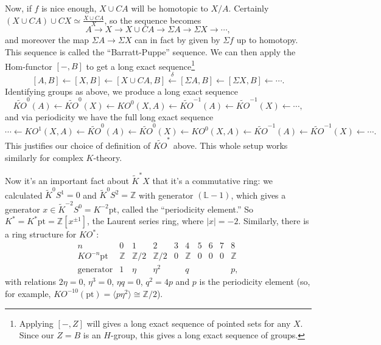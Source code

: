 \documentclass{article}
\newcommand{\Z}{\mathbb{Z}}
\newcommand{\bundle}[1]{\mathbb{#1}}
\newcommand{\ptspace}{\mathrm{pt}}
\newcommand{\Suspend}{\Sigma}
\newcommand{\from}{\leftarrow}
\begin{document}
Now, if $f$ is nice enough, $X \cup CA$ will be homotopic to $X / A$.  Certainly $(X \cup CA) \cup CX \simeq \frac{X \cup CA}{X}$, so the sequence becomes
\[
A \to X \to X \cup CA \to \Suspend A \to \Suspend X \to \cdots
,\]
and moreover the map $\Suspend A \to \Suspend X$ can in fact by given by $\Sigma f$ up to homotopy.  This sequence is called the ``Barratt-Puppe'' sequence.  We can then apply the Hom-functor $[-, B]$ to get a long exact sequence\footnote{Applying $[-, Z]$ will gives a long exact sequence of pointed sets for any $X$.  Since our $Z = B$ is an $H$-group, this gives a long exact sequence of groups.}
\[
[A, B] \from [X, B] \from [X \cup CA, B] \stackrel{\delta}{\from} [\Suspend A, B] \from [\Suspend X, B] \from \cdots
.\]
Identifying groups as above, we produce a long exact sequence
\[
\widetilde{KO}^0 (A) \from \widetilde{KO}^0(X) \from KO^0(X, A) \from \widetilde{KO}^{-1}(A) \from \widetilde{KO}^{-1}(X) \from \cdots
,\]
and via periodicity we have the full long exact sequence
\[
\cdots \from KO^1(X, A) \from \widetilde{KO}^0 (A) \from \widetilde{KO}^0(X) \from KO^0(X, A) \from \widetilde{KO}^{-1}(A) \from \widetilde{KO}^{-1}(X) \from \cdots
.\]
This justifies our choice of definition of $\widetilde{KO}^*$ above.  This whole setup works similarly for complex $K$-theory.

Now it's an important fact about $\tilde K^* X$ that it's a commutative ring: we calculated $\tilde K^0 S^1 = 0$ and $\tilde K^0 S^2 = \Z$ with generator $(\bundle{L} - 1)$, which gives a generator $x \in \tilde K^{-2} S^0 = K^{-2} \ptspace$, called the ``periodicity element.''  So $K^* = K^* \ptspace = \Z[x^{\pm 1}]$, the Laurent series ring, where $|x| = -2$.  Similarly, there is a ring structure for $KO^*$:
\[
\begin{array}{c|ccccccccc}
n & 0 & 1 & 2 & 3 & 4 & 5 & 6 & 7 & 8 \\
\hline
KO^{-n} \ptspace & \Z & \Z/2 & \Z/2 & 0 & \Z & 0 & 0 & 0 & \Z \\
\mathrm{generator} & 1 & \eta & \eta^2 & & q & & & & p,
\end{array}
\]
with relations $2\eta = 0$, $\eta^3 = 0$, $\eta q = 0$, $q^2 = 4p$ and $p$ is the periodicity element (so, for example, $KO^{-10}(\ptspace) = \langle p\eta^2 \rangle \cong \Z/2$).
\end{document}
